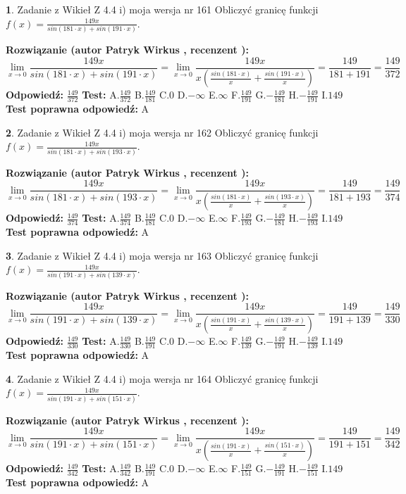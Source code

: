 \documentclass[12pt, a4paper]{article}
\theoremstyle{definition} %
\newtheorem{zad}{}
\newcommand{\zadStart}[1]{\begin{zad}#1\newline}
\newcommand{\zadStop}{\end{zad}}
\newcommand{\rozwStart}[2]{\noindent \textbf{Rozwiązanie (autor #1 , recenzent #2): }\newline}
\newcommand{\rozwStop}{\newline}
\newcommand{\odpStart}{\noindent \textbf{Odpowiedź:}\newline}
\newcommand{\odpStop}{\newline}
\newcommand{\testStart}{\noindent \textbf{Test:}\newline}
\newcommand{\testStop}{\newline}
\newcommand{\kluczStart}{\noindent \textbf{Test poprawna odpowiedź:}\newline}
\newcommand{\kluczStop}{\newline}
\begin{document}
\zadStart{Zadanie z Wikieł Z 4.4 i) moja wersja nr 161}
Obliczyć granicę funkcji $f(x)=\frac{149x}{sin(181\cdot x) +sin(191\cdot x)}$.
\zadStop
\rozwStart{Patryk Wirkus}{}
$$\lim\limits_{x\to 0}\frac{149x}{sin(181\cdot x) +sin(191\cdot x)}=\lim\limits_{x\to 0}\frac{149x}{x(\frac{sin(181\cdot x)}{x}+\frac{sin(191\cdot x)}{x})}=\frac{149}{181+191} = \frac{149}{372}$$
\rozwStop
\odpStart
$\frac{149}{372}$
\odpStop
\testStart
A.$\frac{149}{372}$
B.$\frac{149}{181}$
C.$0$
D.$-\infty$
E.$\infty$
F.$\frac{149}{191}$
G.$-\frac{149}{181}$
H.$-\frac{149}{191}$
I.$149$
\testStop
\kluczStart
A
\kluczStop



\zadStart{Zadanie z Wikieł Z 4.4 i) moja wersja nr 162}
Obliczyć granicę funkcji $f(x)=\frac{149x}{sin(181\cdot x) +sin(193\cdot x)}$.
\zadStop
\rozwStart{Patryk Wirkus}{}
$$\lim\limits_{x\to 0}\frac{149x}{sin(181\cdot x) +sin(193\cdot x)}=\lim\limits_{x\to 0}\frac{149x}{x(\frac{sin(181\cdot x)}{x}+\frac{sin(193\cdot x)}{x})}=\frac{149}{181+193} = \frac{149}{374}$$
\rozwStop
\odpStart
$\frac{149}{374}$
\odpStop
\testStart
A.$\frac{149}{374}$
B.$\frac{149}{181}$
C.$0$
D.$-\infty$
E.$\infty$
F.$\frac{149}{193}$
G.$-\frac{149}{181}$
H.$-\frac{149}{193}$
I.$149$
\testStop
\kluczStart
A
\kluczStop



\zadStart{Zadanie z Wikieł Z 4.4 i) moja wersja nr 163}
Obliczyć granicę funkcji $f(x)=\frac{149x}{sin(191\cdot x) +sin(139\cdot x)}$.
\zadStop
\rozwStart{Patryk Wirkus}{}
$$\lim\limits_{x\to 0}\frac{149x}{sin(191\cdot x) +sin(139\cdot x)}=\lim\limits_{x\to 0}\frac{149x}{x(\frac{sin(191\cdot x)}{x}+\frac{sin(139\cdot x)}{x})}=\frac{149}{191+139} = \frac{149}{330}$$
\rozwStop
\odpStart
$\frac{149}{330}$
\odpStop
\testStart
A.$\frac{149}{330}$
B.$\frac{149}{191}$
C.$0$
D.$-\infty$
E.$\infty$
F.$\frac{149}{139}$
G.$-\frac{149}{191}$
H.$-\frac{149}{139}$
I.$149$
\testStop
\kluczStart
A
\kluczStop



\zadStart{Zadanie z Wikieł Z 4.4 i) moja wersja nr 164}
Obliczyć granicę funkcji $f(x)=\frac{149x}{sin(191\cdot x) +sin(151\cdot x)}$.
\zadStop
\rozwStart{Patryk Wirkus}{}
$$\lim\limits_{x\to 0}\frac{149x}{sin(191\cdot x) +sin(151\cdot x)}=\lim\limits_{x\to 0}\frac{149x}{x(\frac{sin(191\cdot x)}{x}+\frac{sin(151\cdot x)}{x})}=\frac{149}{191+151} = \frac{149}{342}$$
\rozwStop
\odpStart
$\frac{149}{342}$
\odpStop
\testStart
A.$\frac{149}{342}$
B.$\frac{149}{191}$
C.$0$
D.$-\infty$
E.$\infty$
F.$\frac{149}{151}$
G.$-\frac{149}{191}$
H.$-\frac{149}{151}$
I.$149$
\testStop
\kluczStart
A
\kluczStop
\end{document}
